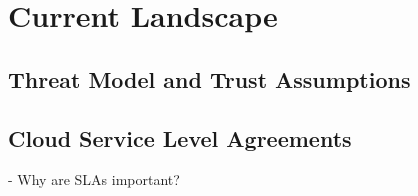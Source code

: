 \section{Current Landscape} \label{sect:current-practice}


\subsection{Threat Model and Trust Assumptions} \label{sect:threat-model}



\subsection{Cloud Service Level Agreements} \label{sect:sla-overview}

- Why are SLAs important?

~\cite{Ahr+10,FMM+13,Kyr13}

